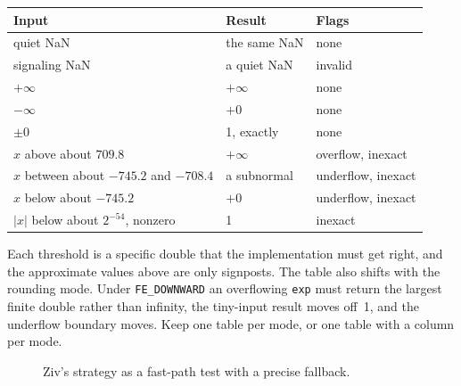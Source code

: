 \documentclass[manuscript, nonacm]{acmart}
\begin{document}
  \begin{table}[tbp]
    \centering
    \begin{tabular}{lll}
      \toprule
      Input                                   & Result       & Flags              \\
      \midrule
      quiet NaN                               & the same NaN & none               \\
      signaling NaN                           & a quiet NaN  & invalid            \\
      $+\infty$                               & $+\infty$    & none               \\
      $-\infty$                               & $+0$         & none               \\
      $\pm 0$                                 & 1, exactly   & none               \\
      $x$ above about $709.8$                 & $+\infty$    & overflow, inexact  \\
      $x$ between about $-745.2$ and $-708.4$ & a subnormal  & underflow, inexact \\
      $x$ below about $-745.2$                & $+0$         & underflow, inexact \\
      $|x|$ below about $2^{-54}$, nonzero    & 1            & inexact            \\
      \bottomrule
    \end{tabular}
  \end{table}

  Each threshold is a specific double that the implementation must get
  right, and the approximate values above are only signposts. The table
  also shifts with the rounding mode. Under \texttt{FE\_DOWNWARD} an
  overflowing \texttt{exp} must return the largest finite double rather
  than infinity, the tiny-input result moves off~1, and the underflow
  boundary moves. Keep one table per mode, or one table with a column per
  mode.

  \begin{figure}[tbp]
    \centering
    \caption{Ziv's strategy as a fast-path test with a precise fallback.}
    \label{fig:ziv}
  \end{figure}
\end{document}
